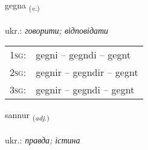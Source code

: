 \documentclass[frontgrid, backgrid]{flacards}\usepackage[]{graphicx}\usepackage[]{xcolor}
\begin{document}
\renewcommand{\flhead}{\vskip5pt \fboxsep=0pt {\small\bfseries\footnotesize Sagnorð | дієслово}}
\renewcommand{\fcfoot}{\vskip5pt \fboxsep=0pt \hspace{2pt}{\small\bfseries\footnotesize 1K}}

\renewcommand{\blhead}{\vskip5pt {\small\bfseries\footnotesize Sagnorð | дієслово }}
\renewcommand{\bcfoot}{\vskip5pt \hspace{2pt}{\small\bfseries\footnotesize 1K}}


{gegna \small{\textsubscript{(\textit{v.})}} \\[1ex] %
\textphonetic{[cɛkna]} \\
ukr.: \emph{говорити; відповідати} \\  [2ex]
\renewcommand*{\arraystretch}{0.8}
\begin{tabular}{p{1cm}l}
\textsc{1sg}: & gegni -- gegndi -- gegnt \\ 
\textsc{2sg}: & gegnir -- gegndir -- gegnt \\ 
\textsc{3sg}: & gegnir -- gegndi -- gegnt \\ 
\end{tabular}
}

\renewcommand{\flhead}{\vskip5pt \fboxsep=0pt {\small\bfseries\footnotesize Lýsingarorð | прикметник}}
\renewcommand{\fcfoot}{\vskip5pt \fboxsep=0pt \hspace{2pt}{\small\bfseries\footnotesize 1K}}

\renewcommand{\blhead}{\vskip5pt {\small\bfseries\footnotesize Lýsingarorð | прикметник }}
\renewcommand{\bcfoot}{\vskip5pt \hspace{2pt}{\small\bfseries\footnotesize 1K}}


{sannur \small{\textsubscript{(\textit{adj.})}} \\[1ex] %
\textphonetic{[sanʏr]} \\
ukr.: \emph{правда; істина} \\  [2ex]
\renewcommand*{\arraystretch}{0.8}
}
\end{document}
